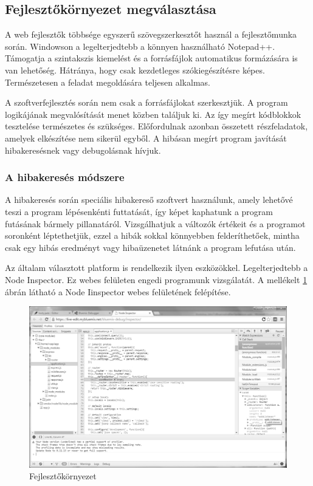 \documentclass[bibliography=totocnumbered]{article}
\begin{document}
\subsection{Fejlesztőkörnyezet
megválasztása}

A web fejlesztők többsége egyszerű szövegszerkesztőt használ a
fejlesztőmunka során. Windowson a legelterjedtebb a könnyen használható
Notepad++. Támogatja a szintakszis kiemelést és a forrásfájlok
automatikus formázására is van lehetőség. Hátránya, hogy csak
kezdetleges szókiegészítésre képes. Természetesen a feladat megoldására
teljesen alkalmas.

A szoftverfejlesztés során nem csak a forrásfájlokat szerkesztjük. A
program logikájának megvalósítását menet közben találjuk ki. Az így
megírt kódblokkok tesztelése természetes és szükséges. Előfordulnak
azonban összetett részfeladatok, amelyek elkészítése nem sikerül egyből.
A hibásan megírt program javítását hibakeresésnek vagy debugolásnak
hívjuk.


\subsubsection{A hibakeresés
módszere}

A hibakeresés során speciális hibakereső szoftvert használunk, amely
lehetővé teszi a program lépésenkénti futtatását, így képet kaphatunk a
program futásának bármely pillanatáról. Vizsgálhatjuk a változók
értékeit és a programot soronként léptethetjük, ezzel a hibák sokkal
könnyebben felderíthetőek, mintha csak egy hibás eredményt vagy
hibaüzenetet látnánk a program lefutása után.

Az általam választott platform is rendelkezik ilyen eszközökkel.
Legelterjedtebb a Node Inspector. Ez webes felületen engedi programunk
vizsgálatát. A mellékelt \ref{fejl} ábrán látható a Node Iinspector webes
felületének felépítése.
\begin{figure}[ht]
	\caption{Fejlesztőkörnyezet}
	\label{fejl}
\includegraphics[scale=0.9]{media/image2.png}
\end{figure}
\end{document}

